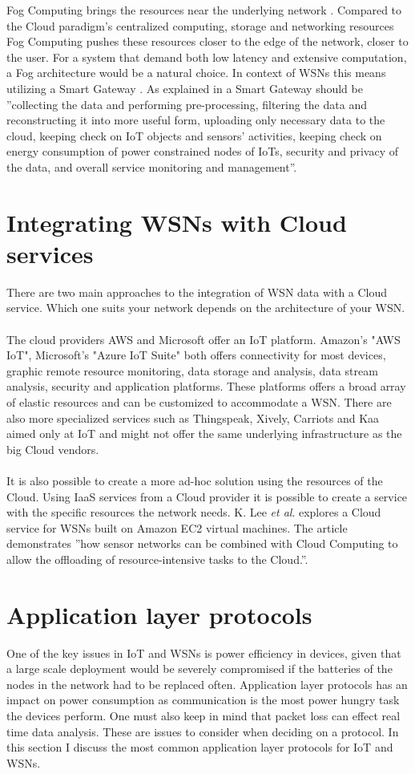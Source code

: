 \documentclass[]{uiophd}
\begin{document}
Fog Computing brings the resources near the underlying network \parencite{6984239}. Compared to the Cloud paradigm's centralized computing, storage and networking resources Fog Computing pushes these resources closer to the edge of the network, closer to the user. For a system that demand both low latency and extensive computation, a Fog architecture would be a natural choice. In context of WSNs this means utilizing a Smart Gateway \parencite{6984239}. As explained in \parencite{69842392} a Smart Gateway should be ''collecting the data and performing pre-processing, filtering the data and reconstructing it into more useful form, uploading only necessary data to the cloud, keeping check on IoT objects and sensors’ activities, keeping check on energy consumption of power constrained nodes of IoTs, security and privacy of the data, and overall service monitoring and management''. 

\section{Integrating WSNs with Cloud services}
There are two main approaches to the integration of WSN data with a Cloud service. Which one suits your network depends on the architecture of your WSN.
\\\\
The cloud providers AWS and Microsoft offer an IoT platform. Amazon's "AWS IoT", Microsoft's "Azure IoT Suite" both offers connectivity for most devices, graphic remote resource monitoring, data storage and analysis, data stream analysis, security and application platforms. These platforms offers a broad array of elastic resources and can be customized to accommodate a WSN. There are also more specialized services such as Thingspeak, Xively, Carriots and Kaa aimed only at IoT and might not offer the same underlying infrastructure as the big Cloud vendors.
\\\\
It is also possible to create a more ad-hoc solution using the resources of the Cloud. Using IaaS services from a Cloud provider it is possible to create a service with the specific resources the network needs. K. Lee \textit{et al}. \parencite{5678063} explores a Cloud service for WSNs built on Amazon EC2 virtual machines. The article demonstrates ''how sensor networks can be combined with Cloud Computing to allow the offloading of resource-intensive tasks to the Cloud.''\parencite{56780637}.

\section{Application layer protocols}
One of the key issues in IoT and WSNs is power efficiency in devices, given that a large scale deployment would be severely compromised if the batteries of the nodes in the network had to be replaced often. Application layer protocols has an impact on power consumption as communication is the most power hungry task the devices perform. One must also keep in mind that packet loss can effect real time data analysis. These are issues to consider when deciding on a protocol. In this section I discuss the most common application layer protocols for IoT and WSNs.
\end{document}

